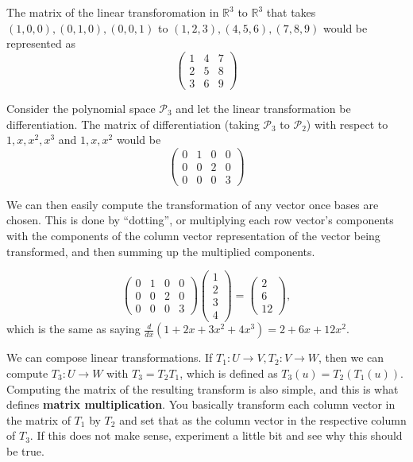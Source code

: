\begin{ex}
The matrix of the linear transforomation in $\mathbb{R}^3$ to
$\mathbb{R}^3$ that takes $(1, 0, 0), (0, 1, 0), (0, 0, 1)$ to $(1, 2,
3),  (4, 5, 6), (7, 8, 9)$ would be represented as
\[ \begin{pmatrix}
1 & 4 & 7 \\
2 & 5 & 8 \\
3 & 6 & 9
\end{pmatrix} \]
\end{ex}

\begin{ex}
Consider the polynomial space $\mathcal{P}_3$ and let the linear
transformation be differentiation. The matrix of differentiation (taking
$\mathcal{P}_3$ to $\mathcal{P}_2$) with respect to $1, x, x^2, x^3$ and
$1, x, x^2$ would be
\[ \begin{pmatrix}
0 & 1 & 0 & 0 \\
0 & 0 & 2 & 0 \\
0 & 0 & 0 & 3
\end{pmatrix} \]
\end{ex}

We can then easily compute the transformation of any vector once bases
are chosen. This is done by ``dotting'', or multiplying each row
vector's components with the components of the column vector
representation of the vector being transformed, and then summing up the
multiplied components.

\begin{ex}
\[ \begin{pmatrix}
0 & 1 & 0 & 0 \\
0 & 0 & 2 & 0 \\
0 & 0 & 0 & 3
\end{pmatrix} \begin{pmatrix}
1 \\ 2 \\ 3 \\ 4
\end{pmatrix} = \begin{pmatrix}
2 \\ 6 \\ 12
\end{pmatrix}, \]
which is the same as saying $\frac{d}{dx}(1 + 2x + 3x^2 + 4x^3) = 2 + 6x
+ 12x^2$.
\end{ex}

\begin{rem}
We can compose linear transformations. If $T_1 : U \rightarrow V, T_2 :
V \rightarrow W$, then we can compute $T_3 : U \rightarrow W$ with $T_3
= T_2 T_1$, which is defined as $T_3(u) = T_2(T_1(u))$. Computing the
matrix of the resulting transform is also simple, and this is what
defines \textbf{matrix multiplication}. You basically transform each
column vector in the matrix of $T_1$ by $T_2$ and set that as the column
vector in the respective column of $T_3$. If this does not make sense,
experiment a little bit and see why this should be true.
\end{rem}

